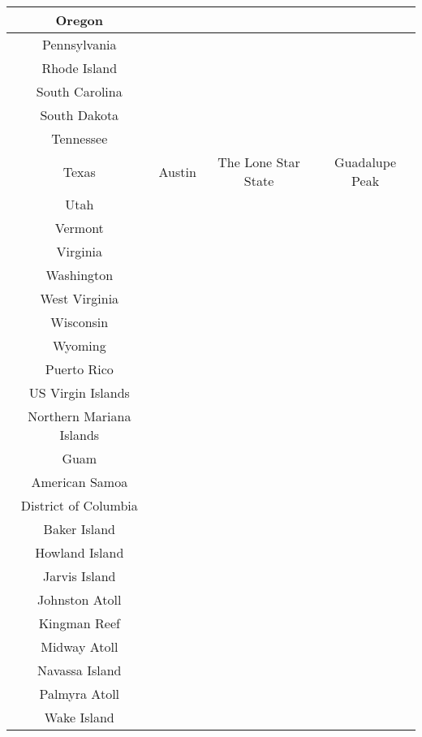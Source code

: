 		 \begin{tabular}{|c|c|c|c|}
				 \hline
				 Oregon 	& & &  \\
				 \hline
				 Pennsylvania 	& & &  \\
				 \hline
				 Rhode Island 	& & &  \\
				 \hline
				 South Carolina 	& & &  \\
				 \hline
				 South Dakota 	& & &  \\
				 \hline
				 Tennessee 	& & &  \\
				 \hline
				 Texas 	& Austin & The Lone Star State & Guadalupe Peak \\
				 \hline
				 Utah 	& & &  \\
				 \hline
				 Vermont 	& & &  \\
				 \hline
				 Virginia 	& & &  \\
				 \hline
				 Washington 	& & &  \\
				 \hline
				 West Virginia 	& & &  \\
				 \hline
				 Wisconsin 	& & &  \\
				 \hline
				 Wyoming 	& & &  \\
				 \hline
				 Puerto Rico	& & &  \\
				 \hline
				 US Virgin Islands	& & &  \\
				 \hline
				 Northern Mariana Islands	& & &  \\
				 \hline
				 Guam	& & &  \\
				 \hline
				 American Samoa	& & &  \\
				 \hline
				 District of Columbia	& & &  \\
				 \hline
				 Baker Island 	& & &  \\
				 \hline
				 Howland Island 	& & &  \\
				 \hline
				 Jarvis Island 	& & &  \\
				 \hline
				 Johnston Atoll 	& & &  \\
				 \hline
				 Kingman Reef 	& & &  \\
				 \hline
				 Midway Atoll 	& & &  \\
				 \hline
				 Navassa Island 	& & &  \\
				 \hline
				 Palmyra Atoll 	& & &  \\
				 \hline
				 Wake Island	& & &  \\
				 \hline
				 
				 
			\end{tabular}
		
